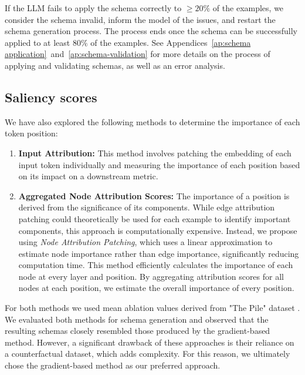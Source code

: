 If the LLM fails to apply the schema correctly to $\geq 20\%$ of the examples, we consider the schema invalid, inform the model of the issues, and restart the schema generation process. The process ends once the schema can be successfully applied to at least $80\%$ of the examples.
See Appendices~\ref{ap:schema application}~and~\ref{ap:schema-validation} for more details on the process of applying and validating schemas, as well as an error analysis.

\subsection{Saliency scores} \label{ap:mask-creation}
We have also explored the following methods to determine the importance of each token position:

\begin{enumerate}
    \item \textbf{Input Attribution:}  
    This method involves patching the embedding of each input token individually and measuring the importance of each position based on its impact on a downstream metric.

    \item \textbf{Aggregated Node Attribution Scores:}  
    The importance of a position is derived from the significance of its components. While edge attribution patching could theoretically be used for each example to identify important components, this approach is computationally expensive. Instead, we propose using \textit{Node Attribution Patching}, which uses a linear approximation to estimate node importance rather than edge importance, significantly reducing computation time. This method efficiently calculates the importance of each node at every layer and position. By aggregating attribution scores for all nodes at each position, we estimate the overall importance of every position. 
\end{enumerate}

For both methods we used mean ablation values derived from "The Pile" dataset \cite{gaopile}. We evaluated both methods for schema generation and observed that the resulting schemas closely resembled those produced by the gradient-based method. However, a significant drawback of these approaches is their reliance on a counterfactual dataset, which adds complexity. For this reason, we ultimately chose the gradient-based method as our preferred approach.

